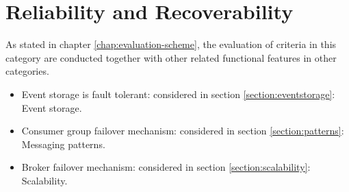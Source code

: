 \section{Reliability and Recoverability } \label{section:reliability}
As stated in chapter \ref{chap:evaluation-scheme}, the evaluation of criteria in this category are conducted together with other related functional features in other categories.  
\begin{itemize}
	\item Event storage is fault tolerant: considered in section \ref{section:eventstorage}: Event storage.
	\item Consumer group failover mechanism: considered in section \ref{section:patterns}: Messaging patterns.
	\item Broker failover mechanism: considered in section \ref{section:scalability}: Scalability.
\end{itemize}
